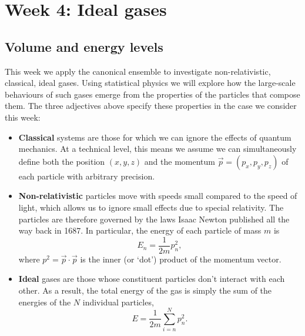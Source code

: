 \renewcommand{\thisweek}{MATH327 Week 4}
\renewcommand{\moddate}{Last modified 20 Feb.~2021}
\setcounter{section}{4}
\setcounter{subsection}{0}
{}
\section*{Week 4: Ideal gases}

\subsection{Volume and energy levels}
This week we apply the canonical ensemble to investigate non-relativistic, classical, ideal gases.
Using statistical physics we will explore how the large-scale behaviours of such gases emerge from the properties of the particles that compose them.
The three adjectives above specify these properties in the case we consider this week: \\[-24 pt]
\begin{itemize}
  \item \textbf{Classical} systems are those for which we can ignore the effects of quantum mechanics.
        At a technical level, this means we assume we can simultaneously define both the position $(x, y, z)$ and the momentum $\vec p = (p_x, p_y, p_z)$ of each particle with arbitrary precision.
  \item \textbf{Non-relativistic} particles move with speeds small compared to the speed of light, which allows us to ignore small effects due to special relativity.
        The particles are therefore governed by the laws Isaac Newton published all the way back in 1687.
        In particular, the energy of each particle of mass $m$ is
        \begin{equation*}
          E_n = \frac{1}{2m} p_n^2,
        \end{equation*}
        where $p^2 = \vec p \cdot \vec p$ is the inner (or `dot') product of the momentum vector.
  \item \textbf{Ideal} gases are those whose constituent particles don't interact with each other.
        As a result, the total energy of the gas is simply the sum of the energies of the $N$ individual particles,
        \begin{equation}
          E = \frac{1}{2m} \sum_{i = n}^N p_n^2.
        \end{equation}
\end{itemize}

